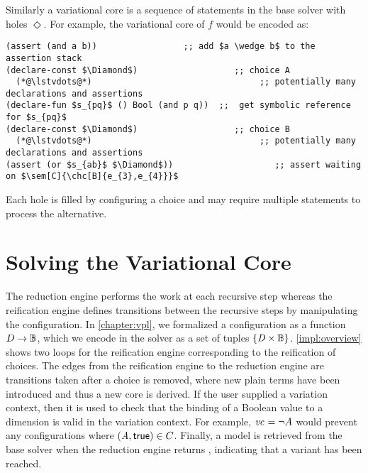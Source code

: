 Similarly a variational core is a sequence of statements in the base solver with
holes $\Diamond$. For example, the variational core of $f$ would be encoded as:
%
\begin{lstlisting}[columns=flexible,keepspaces=true,language=SMTLIB]
(assert (and a b))                 ;; add $a \wedge b$ to the assertion stack
(declare-const $\Diamond$)                   ;; choice A
  (*@\lstvdots@*)                                 ;; potentially many declarations and assertions
(declare-fun $s_{pq}$ () Bool (and p q))  ;;  get symbolic reference for $s_{pq}$
(declare-const $\Diamond$)                   ;; choice B
  (*@\lstvdots@*)                                 ;; potentially many declarations and assertions
(assert (or $s_{ab}$ $\Diamond$))                    ;; assert waiting on $\sem[C]{\chc[B]{e_{3},e_{4}}}$
\end{lstlisting}
%
Each hole is filled by configuring a choice and may require multiple
statements to process the alternative.

\section{Solving the Variational Core}

The reduction engine performs the work at each recursive step whereas the
reification engine defines transitions between the recursive steps by
manipulating the configuration. In \autoref{chapter:vpl}, we formalized
a configuration as a function $D\to\mathbb{B}{}$, which we encode in the solver
as a set of tuples $\{\mathit{D \times \mathbb{B}}\}$.
%
\autoref{impl:overview} shows two loops for the reification engine corresponding
to the reification of choices. The edges from the reification engine to the
reduction engine are transitions taken after a choice is removed, where new
plain terms have been introduced and thus a new core is derived. If the user
supplied a variation context, then it is used to check that the binding of a
Boolean value to a dimension is valid in the variation context. For example,
$\mathit{vc}_{} = \neg A$ would prevent any configurations where $\kf{(A,\true)} \in C$.
Finally, a model is retrieved from the base solver when the reduction engine
returns \unit{}, indicating that a variant has been reached.

